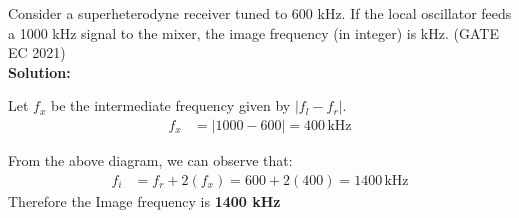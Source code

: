 \documentclass{article}
\begin{document}
Consider a superheterodyne receiver tuned to 600 kHz. If the local oscillator feeds a 1000 kHz signal to the mixer, the image frequency (in integer) is \underline{\hspace{1cm}} kHz.
\hfill(GATE EC 2021)\\

\textbf{Solution:}

Let \(f_x\) be the intermediate frequency given by \(|f_l - f_r|\).
\begin{align}
    f_x &= |1000-600| = 400 \, \text{kHz}
\end{align}


From the above diagram, we can observe that:
\begin{align}
    f_i &= f_r+2(f_x) = 600+2(400)=1400 \, \text{kHz}
\end{align}
Therefore the Image frequency is \textbf{1400 kHz}

\end{document}
